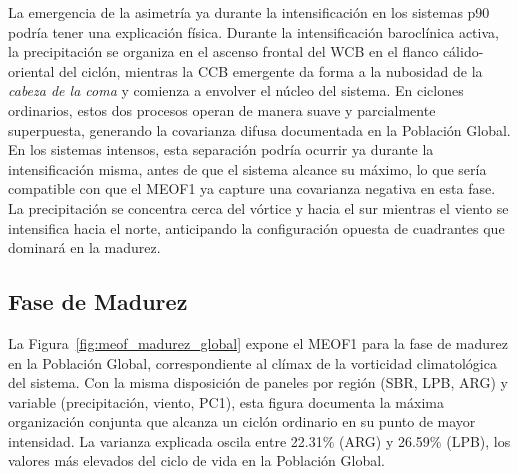 La emergencia de la asimetría ya durante la intensificación en los sistemas p90 podría tener una explicación física.
Durante la intensificación baroclínica activa, la precipitación se organiza en el ascenso frontal del WCB en el flanco cálido-oriental del ciclón, mientras la CCB emergente da forma a la nubosidad de la \textit{cabeza de la coma} \citep{browning1986conceptual} y comienza a envolver el núcleo del sistema.
En ciclones ordinarios, estos dos procesos operan de manera suave y parcialmente superpuesta, generando la covarianza difusa documentada en la Población Global.
En los sistemas intensos, esta separación podría ocurrir ya durante la intensificación misma, antes de que el sistema alcance su máximo, lo que sería compatible con que el MEOF1 ya capture una covarianza negativa en esta fase. La precipitación se concentra cerca del vórtice y hacia el sur mientras el viento se intensifica hacia el norte, anticipando la configuración opuesta de cuadrantes que dominará en la madurez.

\subsection{Fase de Madurez}
\label{subsec:meof_madurez}

La Figura~\ref{fig:meof_madurez_global} expone el MEOF1 para la fase de madurez en la Población Global, correspondiente al clímax de la vorticidad climatológica del sistema.
Con la misma disposición de paneles por región (SBR, LPB, ARG) y variable (precipitación, viento, PC1), esta figura documenta la máxima organización conjunta que alcanza un ciclón ordinario en su punto de mayor intensidad.
La varianza explicada oscila entre 22.31\% (ARG) y 26.59\% (LPB), los valores más elevados del ciclo de vida en la Población Global.

